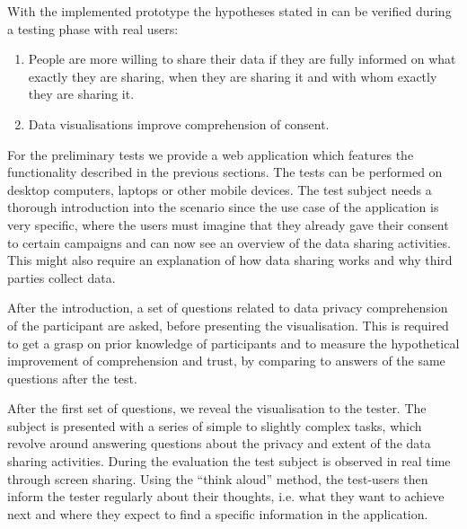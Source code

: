 \documentclass[../paper.tex]{subfiles}
\begin{document}
  With the implemented prototype the hypotheses stated in  can be verified during a
  testing phase with real users:
  \begin{enumerate}
    \item People are more willing to share their data if they are fully informed
          on what exactly they are sharing, when they are sharing it and with
          whom exactly they are sharing it.
    \item Data visualisations improve comprehension of consent.
  \end{enumerate}


  For the preliminary tests we provide a web application which features the functionality described in the
  previous sections. The tests can be performed on desktop computers, laptops
  or other mobile devices. The test subject needs a thorough introduction
  into the scenario since the use case of the application is very specific, where the users must imagine that they already gave their consent to certain campaigns and can now see an overview of the data sharing activities.
  This might also require an explanation of how data sharing
  works and why third parties collect data.

  After the introduction, a set of questions related to data privacy comprehension
  of the participant are asked, before presenting the visualisation. This is
  required to get a grasp on prior knowledge of participants and to measure the
  hypothetical improvement of comprehension and trust, by comparing to answers of
  the same questions after the test.

  After the first set of questions, we reveal the visualisation to the tester. The subject is presented with
  a series of simple to slightly complex tasks, which revolve around answering
  questions about the privacy and extent of the data sharing activities.
  During the evaluation the test subject is observed in real time
  through screen sharing. Using the “think aloud” method, the test-users then
  inform the tester regularly about their thoughts, i.e. what
  they want to achieve next and where they expect to find a specific information
  in the application. 
\end{document}
